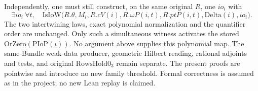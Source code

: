 Independently, one must still construct, on the same original \(R\),
one \(io_i\) with
\[
 \exists io_i\ \forall t,\quad
 \mathrm{IsIoW}\bigl(R.\theta,M_i,R.cV(i),
       R.\omega P(i,t),R.ptP(i,t),\mathrm{Delta}(i),io_i\bigr).
 \tag{HCU.58}
\]
The two intertwining laws, exact polynomial normalization and the
quantifier order are unchanged.  Only such a simultaneous witness
activates the stored \(\mathrm{OrZero}(\mathrm{PIoP}(i))\).
No argument above supplies this polynomial map.
The same-Bundle weak-data producer, geometric Hilbert reading,
rational adjoints and tests, and original \(\mathrm{RowsHold0_3}\)
remain separate.  The present proofs are pointwise and introduce
no new family threshold.  Formal correctness is assumed as in the
project; no new Lean replay is claimed.





